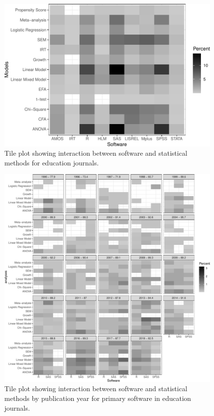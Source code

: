 \documentclass[
  english,
  ,man]{apa6}
\begin{document}
\begin{figure}
\centering
\includegraphics{software_files/figure-latex/software-statmethods-1.pdf}
\caption{\label{fig:software-statmethods}Tile plot showing interaction between software and statistical methods for education journals.}
\end{figure}

\begin{figure}
\centering
\includegraphics{software_files/figure-latex/software-statmethods-year-1.pdf}
\caption{\label{fig:software-statmethods-year}Tile plot showing interaction between software and statistical methods by publication year for primary software in education journals.}
\end{figure}
\end{document}
